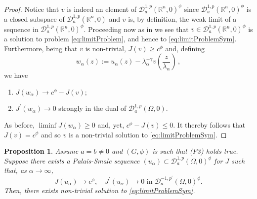 \documentclass[10pt, reqno]{amsart}
\newcommand{\RR}{\mathbb{R}}
\newcommand{\Om}{\Omega}
\newcommand{\D}{\mathcal{D}}
\numberwithin{equation}{section}
\theoremstyle{definition}
\theoremstyle{remark}
\theoremstyle{plain}
\newtheorem{prop}{Proposition}[section]
\begin{document}
\begin{proof}
	
		Notice that $v$ is indeed an element of $\D_a^{1,p}(\RR^n,0)^\phi$ since  $\D_a^{1,p}(\RR^n,0)^\phi$ is a closed subspace of  $\D_a^{1,p}(\RR^n,0)$ and $v$ is, by definition, the weak limit of a sequence in $\D_a^{1,p}(\RR^n,0)^\phi$. Proceeding now as in \cite[Proposition 6.2]{Chernysh} we see that $v \in \D_a^{1,p}(\RR^n,0)^\phi$ is a solution to problem \eqref{eq:limitProblem}, and hence to \eqref{eq:limitProblemSym}. Furthermore, being that $v$ is non-trivial, $J(v) \ge c^\phi$ and, defining
		\[
		w_\alpha(z) := u_\alpha(z) - \lambda_\alpha^{-\gamma}v\left(\frac{z}{\lambda_\alpha}\right)\,,
		\]
		we have
		\begin{enumerate}
			\item $J(w_\alpha ) \to c^\phi - J(v)$;
			\item $J^\prime(w_\alpha) \to 0$ strongly in the dual of $\D_a^{1,p}(\Om,0)$.
		\end{enumerate}
		As before, $\liminf J(w_\alpha) \ge 0$ and, yet, $c^\phi - J(v) \le 0$. It thereby follows that $J(v) = c^\phi$ and so $v$ is a non-trivial solution to \eqref{eq:limitProblemSym}.
		
		
	\end{proof}
	
	\begin{prop}\label{prop:struwea=b}
		Assume $a = b \ne 0$ and $(G, \phi)$ is such that (P3) holds true. Suppose there exists a Palais-Smale sequence $(u_\alpha) \subset \D^{1,p}_a(\Om,0)^\phi$ for $J$ such that, as $\alpha \to \infty$,
		\[
		J(u_\alpha) \to c^\phi, \quad J^\prime(u_\alpha) \to 0 \text{ in } \D^{-1,p^\prime}_a(\Om,0)^\phi.
		\]
		Then, there exists non-trivial solution to \eqref{eq:limitProblemSym}.
	\end{prop}
	
\end{document}
